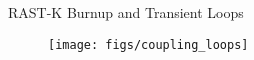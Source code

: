 \begin{frame}{RAST-K Burnup and Transient Loops}

  \scriptsize

  \begin{figure}[h]
    \texttt{[image: figs/coupling\_loops]}
  \end{figure}  

\end{frame}
